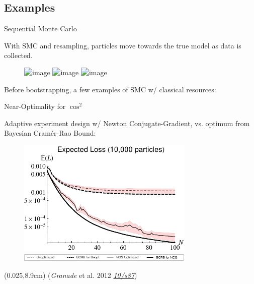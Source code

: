 \documentclass[xcolor=dvipsnames, compress]{beamer}
\renewcommand\UrlFont{\color{red}\rmfamily\itshape}
\newcommand{\shortdoi}[1]{\href{http://doi.org/#1}{\UrlFont 10/#1}}
\newcommand{\bottomnote}[1]{
  \begin{textblock*}{0.95\paperwidth} (0.025\paperwidth,8.9cm)
    {\tiny \hfill #1}
  \end{textblock*}
}
\begin{document}
\subsection{Examples}

\begin{frame}{Sequential Monte Carlo}
  
  With SMC and resampling, particles move towards the true model as data is collected.
  
  \begin{figure}
    \includegraphics<1>[width=0.6\textwidth]{figures/1D_SMC_1_v2}
    \includegraphics<2>[width=0.6\textwidth]{figures/1D_SMC_6_v2}
    \includegraphics<3>[width=0.6\textwidth]{figures/1D_SMC_11_v2}
  \end{figure}
  
\end{frame}

\begin{frame}{}

  Before bootstrapping, a few examples of SMC w/ classical resources:

\end{frame}

\begin{frame}{Near-Optimality for $\cos^2$}

  Adaptive experiment design w/ Newton Conjugate-Gradient,
  vs. optimum from Bayesian Cram\'er-Rao Bound:

  \begin{figure}
    \centering
    \includegraphics[width=0.75\textwidth]{figures/knownT2-10000-particles-mse} \\
    \includegraphics[width=0.75\textwidth]{figures/knownT2-n-particles-mse-legend}
  \end{figure}

  \bottomnote{(\emph{Granade} et al. 2012 \shortdoi{s87})}

\end{frame}
\end{document}
